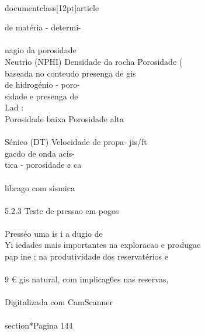 \\documentclass[12pt]{article}
\begin{document}
{de matéria - determi-\\
\\
nagio da porosidade\\
Neutrio (NPHI) Densidade da rocha Porosidade (\\%
baseada no conteudo presenga de gis\\
de hidrogénio - poro-\\
sidade e presenga de\\
Lad :\\
Porosidade baixa Porosidade alta\\
\\
Sénico (DT) Velocidade de propa- jis/ft\\
gacdo de onda acis-\\
tica - porosidade ¢ ca\\
\\
librago com sismica\\
\\
5.2.3 Teste de pressao em pogos\\
\\
Presséo uma is i a dugio de\\
Yi iedades mais importantes na exploracao e produgac\\
pap ine ; na produtividade dos reservatérios e\\
\\
9 € gis natural, com implicag6es nas reservas,\\
\\
Digitalizada com CamScanner\\

\\section*{Pagina 144}

}
\end{document}
